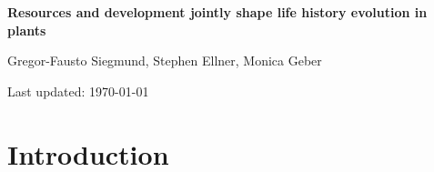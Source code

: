 \documentclass[12pt, oneside,titlepage]{article}   	%
\begin{document}
 

\begin{titlepage}
   \begin{center}
       \vspace*{1cm}
 
       \textbf{Resources and development jointly shape life history evolution in plants}
 
       \vspace{1.5cm}
 
       Gregor-Fausto Siegmund, Stephen Ellner, Monica Geber
 
   	Last updated: \today
 
   \end{center}
\end{titlepage}


\section{Introduction}
\end{document}
